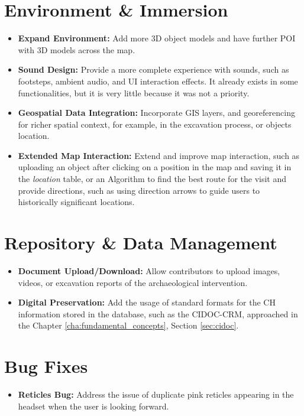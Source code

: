 \section*{Environment \& Immersion}
\begin{itemize}
    \item \textbf{Expand Environment:} Add more \gls{3D} object models and have further \gls{POI} with \gls{3D} models across the map.
    \item \textbf{Sound Design:} Provide a more complete experience with sounds, such as footsteps, ambient audio, and \gls{UI} interaction effects. It already exists in some functionalities, but it is very little because it was not a priority.
    \item \textbf{Geospatial Data Integration:} Incorporate \gls{GIS} layers, and georeferencing for richer spatial context, for example, in the excavation process, or objects location.
    \item \textbf{Extended Map Interaction:} Extend and improve map interaction, such as uploading an object after clicking on a position in the map and saving it in the \emph{location} table, or an Algorithm to find the best route for the visit and provide directions, such as using direction arrows to guide users to historically significant locations.
\end{itemize}

\section*{Repository \& Data Management}
\begin{itemize}
    \item \textbf{Document Upload/Download:} Allow contributors to upload images, videos, or excavation reports of the archaeological intervention.
    \item \textbf{Digital Preservation:} Add the usage of standard formats for the \gls{CH} information stored in the database, such as the \gls{CIDOC-CRM}, approached in the Chapter \ref{cha:fundamental_concepts}, Section \ref{sec:cidoc}.
\end{itemize}
\section*{Bug Fixes}
\begin{itemize}
    \item \textbf{Reticles Bug:} Address the issue of duplicate pink reticles appearing in the headset when the user is looking forward.
\end{itemize}


